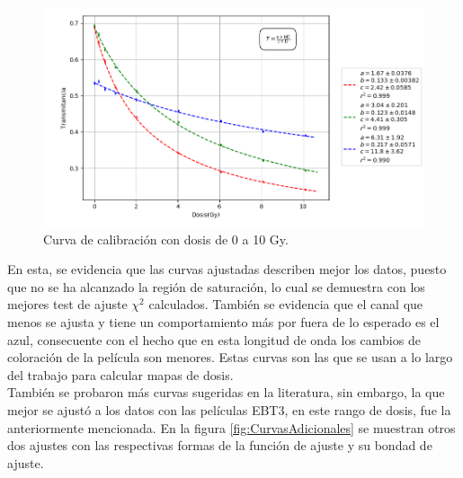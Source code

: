 \begin{figure}[H]
	\centering
	\includegraphics[width=\linewidth]{images/calibracionMulti.png}
	\caption{Curva de calibración con dosis de 0 a 10 Gy. }
	\label{fig:curvaFinal}
\end{figure}

En esta, se evidencia que las curvas ajustadas describen mejor los datos, puesto que no se ha alcanzado la región de saturación, lo cual se demuestra con los mejores test de ajuste $\chi ^2$ calculados. También se evidencia que el canal que menos se ajusta y tiene un comportamiento más por fuera de lo esperado es el azul, consecuente con el hecho que en esta longitud de onda los cambios de coloración de la película son menores. Estas curvas son las que se usan a lo largo del trabajo para calcular mapas de dosis.\\

También se probaron más curvas sugeridas en la literatura, sin embargo, la que mejor se ajustó a los datos con las películas EBT3, en este rango de dosis, fue la anteriormente mencionada. En la figura \ref{fig:CurvasAdicionales} se muestran otros dos ajustes con las respectivas formas de la función de ajuste y su bondad de ajuste.


